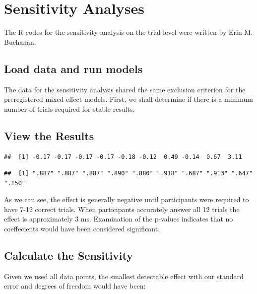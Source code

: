 \documentclass[
  man,floatsintext]{apa7}
\begin{document}
\newpage

\hypertarget{appendix-appendix}{%
\appendix}


\hypertarget{sensitivity-analyses}{%
\section{Sensitivity Analyses}\label{sensitivity-analyses}}

The R codes for the sensitivity analysis on the trial level were written by Erin M. Buchanan.

\hypertarget{load-data-and-run-models}{%
\subsection{Load data and run models}\label{load-data-and-run-models}}

The data for the sensitivity analysis shared the same exclusion criterion for the preregistered mixed-effect models. First, we shall determine if there is a minimum number of trials required for stable results.

\hypertarget{view-the-results}{%
\subsection{View the Results}\label{view-the-results}}

\begin{verbatim}
##  [1] -0.17 -0.17 -0.17 -0.17 -0.18 -0.12  0.49 -0.14  0.67  3.11
\end{verbatim}

\begin{verbatim}
##  [1] ".887" ".887" ".887" ".890" ".880" ".918" ".687" ".913" ".647" ".150"
\end{verbatim}

As we can see, the effect is generally negative until participants were required to have 7-12 correct trials. When participants accurately answer all 12 trials the effect is approximately 3 ms. Examination of the p-values indicates that no coeffecients would have been considered significant.

\hypertarget{calculate-the-sensitivity}{%
\subsection{Calculate the Sensitivity}\label{calculate-the-sensitivity}}

Given we used all data points, the smallest detectable effect with our standard error and degrees of freedom would have been:
\end{document}
